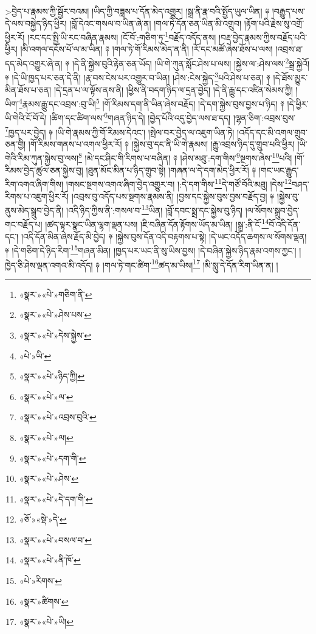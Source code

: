 >བྱེད་པ་རྣམས་ཀྱི་སྦྱོར་བའམ། །ཡིད་ཀྱི་བཟླས་པ་དོན་མེད་འགྱུར། །སྒྲ་ནི་རྣ་བའི་སྤྱོད་ཡུལ་ཡིན། ༈ །བརྒྱུད་པས་དེ་ལས་བསྐྱེད་ཉིད་ཕྱིར། །བློ་དེའང་གསལ་བ་ཡིན་ཞེ་ན། །གལ་ཏེ་དོན་ཅན་ཡིན་མི་འགྲུབ། །རྟོག་པའི་རྗེས་སུ་འགྲོ་ཕྱིར་རོ། །རང་དང་སྤྱི་ཡི་རང་བཞིན་རྣམས། །ངོ་བོ་:གཅིག་ཏུ་\footnote{«སྣར་»«པེ་»གཅིག་ནི་}བརྗོད་འདོད་ནས། །བརྡ་བྱེད་རྣམས་ཀྱིས་བརྗོད་པའི་ཕྱིར། །མི་འགལ་དངོས་པོ་ལ་མ་ཡིན། ༈ །གལ་ཏེ་གོ་རིམས་མེད་ན་ནི། །རོ་དང་མཚོ་ཞེས་ཐོས་པ་ལས། །འབྲས་ཐ་དད་མེད་འགྱུར་ཞེ་ན། ༈ །དེ་ནི་སྐྱེས་བུའི་རྟེན་ཅན་ཡོད། །ཡི་གེ་ཀུན་སློང་ཤེས་པ་ལས། །སྐྱེས་ལ་:ཤེས་ལས་\footnote{«སྣར་»«པེ་»ཤེས་པས་}སྒྲ་སྐྱེའོ། ༈ །དེ་ཡི་ཁྱད་པར་ཅན་དེ་ནི། །རྣ་བས་ངེས་པར་འགྱུར་བ་ཡིན། །ཤེས་:ངེས་སྐྱེད་\footnote{«སྣར་»«པེ་»དེས་སྐྱེས་}པའི་ཤེས་པ་ཅན། ༈ །དེ་ཐོས་མྱུར་མིན་ཐོས་པ་ཅན། །དེ་དྲན་པ་ལ་ལྟོས་ནས་ནི། །ཕྱིས་ནི་བདག་ཉིད་ལ་དྲན་བྱེད། །དེ་ནི་རྒྱུ་དང་འཛིན་སེམས་ཀྱི། །ཡིག་\footnote{«པེ་»ཡི་}རྣམས་རྒྱུ་དང་འབྲས་:བུ་ཡི།\footnote{«སྣར་»«པེ་»ཉིད་ཀྱི།} །གོ་རིམས་དག་ནི་ཡིན་ཞེས་བརྗོད། །དེ་དག་སྐྱེས་བུས་བྱས་པ་ཉིད། ༈ །དེ་ཕྱིར་ཡི་གེའི་ངོ་བོ་དེ། །ཚིག་དང་ཚིག་ལས་\footnote{«སྣར་»«པེ་»ལ་}གཞན་ཉིད་དེ། །བྱེད་པོའི་འདུ་བྱེད་ལས་ཐ་དད། །ལྷན་ཅིག་:འབྲས་བུས་\footnote{«སྣར་»«པེ་»འབྲས་བུའི་}ཁྱད་པར་བྱེད། ༈ །ཡི་གེ་རྣམས་ཀྱི་གོ་རིམས་དེའང་། །སྤེལ་བར་བྱེད་ལ་འཇུག་ཡིན་ཏེ། །འདོད་དང་མི་འགལ་གྲུབ་ཅན་གྱི། །གོ་རིམས་གནས་པ་འགལ་ཕྱིར་རོ། ༈ །སྐྱེས་བུ་དང་ནི་ཡི་གེ་རྣམས། །རྒྱུ་འབྲས་ཉིད་དུ་གྲུབ་པའི་ཕྱིར། །ཡི་གེའི་རིམ་ཀུན་སྐྱེས་བུ་ལས།\footnote{«སྣར་»«པེ་»ལ།} །མེ་དང་ཤིང་གི་རིགས་པ་བཞིན། ༈ །ཤེས་མཐུ་:དག་གིས་\footnote{«སྣར་»«པེ་»དག་གི་}སྔགས་ཞེས་\footnote{«སྣར་»«པེ་»ཤེས་}པའི། །གོ་རིམས་བྱེད་ཚུལ་ཅན་སྐྱེས་བུ། །ཐུན་མོང་མིན་པ་ཉིད་གྲུབ་སྟེ། །གཞན་ལ་དེ་དག་མེད་ཕྱིར་རོ། ༈ །གང་ཡང་རྒྱུད་རིག་འགའ་ཞིག་གིས། །གསང་སྔགས་འགའ་ཞིག་བྱེད་འགྱུར་བ། །:དེ་དག་གིས་\footnote{«སྣར་»«པེ་»དེ་དག་གི་}དེ་གཙོ་བོའི་མཐུ། །དེས་\footnote{«ཅོ་»«སྡེ་»དེ་}བཤད་རིགས་པ་འཇུག་ཕྱིར་རོ། །འབྲས་བུ་འདོད་པས་སྔགས་རྣམས་ནི། །བྱས་དང་སྐྱེས་བུས་བྱས་བརྗོད་བྱ། ༈ །སྐྱེས་བུ་ནུས་མེད་སྒྲུབ་བྱེད་ནི། །འདི་ཉིད་ཀྱིས་ནི་:གསལ་བ་\footnote{«སྣར་»«པེ་»བསལ་བ་}ཡིན། །བློ་དབང་སྨྲ་དང་སྐྱེས་བུ་ཉིད། །ལ་སོགས་སྒྲུབ་བྱེད་གང་བརྗོད་པ། །ཚད་ལྟར་སྣང་ཡིན་ལྷག་ལྡན་པས། །ཇི་བཞིན་དོན་རྟོགས་ཡོད་མ་ཡིན། །སྒྲ་:ནི་ངོ་\footnote{«སྣར་»«པེ་»ནི་ཁོ་}བོ་འདི་དོན་དང་། །འདི་དོན་མིན་ཞེས་རྗོད་མི་བྱེད། ༈ །སྐྱེས་བུས་དོན་འདི་བརྟགས་པ་སྟེ། །དེ་ཡང་འདོད་ཆགས་ལ་སོགས་ལྡན། ༈ །དེ་གཅིག་དེ་ཉིད་རིག་\footnote{«པེ་»རིགས་}གཞན་མིན། །ཁྱད་པར་ཡང་ནི་སུ་ཡིས་བྱས། །དེ་བཞིན་སྐྱེས་ཉིད་རྣམ་འགས་ཀྱང་། །ཁྱེད་ཅི་ཤེས་ལྡན་འགའ་མི་འདོད། ༈ །གལ་ཏེ་གང་ཚིག་\footnote{«སྣར་»ཚིགས་}ཚད་མ་ཡིས།\footnote{«སྣར་»«པེ་»ཡི།} །མི་སླུ་དེ་དོན་རིག་ཡིན་ན། །
